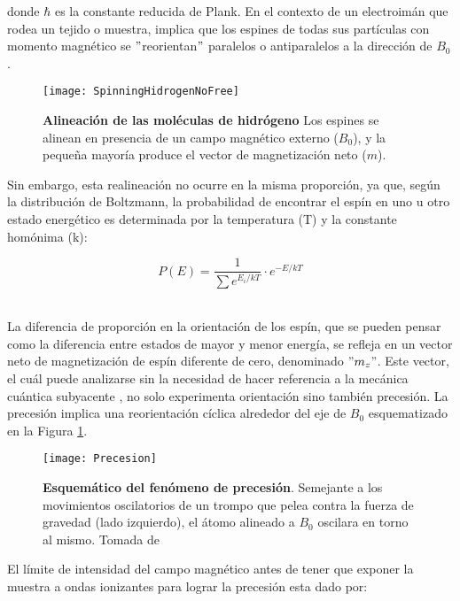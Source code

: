 \documentclass[11pt,letterpaper]{article}
\numberwithin{equation}{subsection}
\numberwithin{table}{subsection}
\begin{document}
\noindent donde $\hbar$ es la constante reducida de Plank. En el contexto de un electroimán que rodea un tejido o muestra, implica que los espines de todas sus partículas con momento magnético se $"$reorientan$"$ paralelos o antiparalelos a la dirección de $B_0$. 

\begin{figure}[H]
\centering
	\texttt{[image: SpinningHidrogenNoFree]}
	\captionsetup{labelfont=bf}
	\caption{\scriptsize \textbf{Alineación de las moléculas de hidrógeno} Los espines se alinean en presencia de un campo magnético externo ($B_0$), y la pequeña mayoría produce el vector de magnetización neto ($m$).}
	\label{fig:Fig6}
\end{figure}

Sin embargo, esta realineación no ocurre en la misma proporción, ya que, según la distribución de Boltzmann, la probabilidad de encontrar el espín en uno u otro estado energético es determinada por la temperatura (T) y la constante homónima (k):

\begin{equation}
P(E)=\frac{1}{\sum e^{E_i/kT}}\cdot e^{-E/kT}
\end{equation}\



\bigskip
\noindent La diferencia de proporción en la orientación de los espín, que se pueden pensar como la diferencia entre estados de mayor y menor energía, se refleja en un vector neto de magnetización de espín diferente de cero, denominado $"m_z"$. Este vector, el cuál puede analizarse sin la necesidad de hacer referencia a la mecánica cuántica subyacente \cite{brown2014magnetic}, no solo experimenta orientación sino también precesión. La precesión implica una reorientación cíclica alrededor del eje de $B_0$ esquematizado en la Figura \ref{fig:Fig6}. 

\begin{figure}[H]
\centering
	\texttt{[image: Precesion]}
	\captionsetup{labelfont=bf}
	\caption{\scriptsize \textbf{Esquemático del fenómeno de precesión}. Semejante a los movimientos oscilatorios de un trompo que pelea contra la fuerza de gravedad (lado izquierdo), el átomo alineado a $B_0$ oscilara en torno al mismo. Tomada de \cite{weishaupt2006does}}
	\label{fig:Fig7}
\end{figure}


El límite de intensidad del campo magnético antes de tener que exponer la muestra a ondas ionizantes para lograr la precesión esta dado por:
\end{document}
